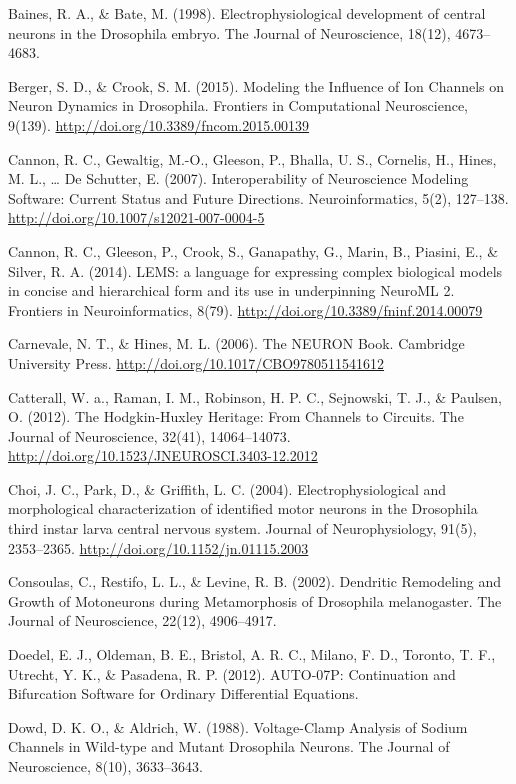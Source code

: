 \documentclass[12pt,a4paper,]{report}
\begin{document}
Baines, R. A., \& Bate, M. (1998). Electrophysiological development of
central neurons in the Drosophila embryo. The Journal of Neuroscience,
18(12), 4673--4683.

Berger, S. D., \& Crook, S. M. (2015). Modeling the Influence of Ion
Channels on Neuron Dynamics in Drosophila. Frontiers in Computational
Neuroscience, 9(139). \url{http://doi.org/10.3389/fncom.2015.00139}

Cannon, R. C., Gewaltig, M.-O., Gleeson, P., Bhalla, U. S., Cornelis,
H., Hines, M. L., \ldots{} De Schutter, E. (2007). Interoperability of
Neuroscience Modeling Software: Current Status and Future Directions.
Neuroinformatics, 5(2), 127--138.
\url{http://doi.org/10.1007/s12021-007-0004-5}

Cannon, R. C., Gleeson, P., Crook, S., Ganapathy, G., Marin, B.,
Piasini, E., \& Silver, R. A. (2014). LEMS: a language for expressing
complex biological models in concise and hierarchical form and its use
in underpinning NeuroML 2. Frontiers in Neuroinformatics, 8(79).
\url{http://doi.org/10.3389/fninf.2014.00079}

Carnevale, N. T., \& Hines, M. L. (2006). The NEURON Book. Cambridge
University Press. \url{http://doi.org/10.1017/CBO9780511541612}

Catterall, W. a., Raman, I. M., Robinson, H. P. C., Sejnowski, T. J., \&
Paulsen, O. (2012). The Hodgkin-Huxley Heritage: From Channels to
Circuits. The Journal of Neuroscience, 32(41), 14064--14073.
\url{http://doi.org/10.1523/JNEUROSCI.3403-12.2012}

Choi, J. C., Park, D., \& Griffith, L. C. (2004). Electrophysiological
and morphological characterization of identified motor neurons in the
Drosophila third instar larva central nervous system. Journal of
Neurophysiology, 91(5), 2353--2365.
\url{http://doi.org/10.1152/jn.01115.2003}

Consoulas, C., Restifo, L. L., \& Levine, R. B. (2002). Dendritic
Remodeling and Growth of Motoneurons during Metamorphosis of Drosophila
melanogaster. The Journal of Neuroscience, 22(12), 4906--4917.

Doedel, E. J., Oldeman, B. E., Bristol, A. R. C., Milano, F. D.,
Toronto, T. F., Utrecht, Y. K., \& Pasadena, R. P. (2012). AUTO-07P:
Continuation and Bifurcation Software for Ordinary Differential
Equations.

Dowd, D. K. O., \& Aldrich, W. (1988). Voltage-Clamp Analysis of Sodium
Channels in Wild-type and Mutant Drosophila Neurons. The Journal of
Neuroscience, 8(10), 3633--3643.
\end{document}
